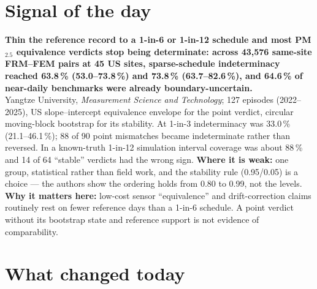 \documentclass[10pt]{article}
\begin{document}
\vspace{6mm}

\section*{\sffamily\bfseries\color{Deep}Signal of the day}
\vspace{-1.5mm}{\color{Amber}\rule{\linewidth}{1.1pt}}\vspace{2.5mm}

\begin{keybox}
{\sffamily\bfseries\small\color{Deep}Thin the reference record to a 1-in-6 or 1-in-12 schedule and most PM$_{2.5}$ equivalence verdicts stop being determinate: across 43,576 same-site FRM--FEM pairs at 45 US sites, sparse-schedule indeterminacy reached 63.8\,\% (53.0--73.8\,\%) and 73.8\,\% (63.7--82.6\,\%), and 64.6\,\% of near-daily benchmarks were already boundary-uncertain.}\\[1.4mm]
\footnotesize
Yangtze University, \textit{Measurement Science and Technology}; 127 episodes (2022--2025), US slope--intercept equivalence envelope for the point verdict, circular moving-block bootstrap for its stability. At 1-in-3 indeterminacy was 33.0\,\% (21.1--46.1\,\%); 88 of 90 point mismatches became indeterminate rather than reversed. In a known-truth 1-in-12 simulation interval coverage was about 88\,\% and 14 of 64 ``stable'' verdicts had the wrong sign.
\textbf{Where it is weak:} one group, statistical rather than field work, and the stability rule (0.95/0.05) is a choice --- the authors show the ordering holds from 0.80 to 0.99, not the levels.
\textbf{Why it matters here:} low-cost sensor ``equivalence'' and drift-correction claims routinely rest on fewer reference days than a 1-in-6 schedule. A point verdict without its bootstrap state and reference support is not evidence of comparability.\par
\end{keybox}

\vspace{3mm}

\section*{\sffamily\bfseries\color{Deep}What changed today}
\vspace{-1.5mm}{\color{Amber}\rule{\linewidth}{1.1pt}}\vspace{2.5mm}
\end{document}
